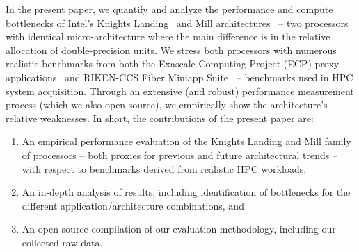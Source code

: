 In the present paper, we quantify and analyze the performance and compute bottlenecks of
Intel's Knights Landing~\cite{sodani_knights_2016} and Mill architectures~\cite{bradford_knights_2017} -- two
processors with identical micro-architecture where the main difference is in the relative allocation of double-precision units.
We stress both processors with numerous realistic benchmarks from both the
Exascale Computing Project (ECP) proxy applications~\cite{noauthor_ecp_2018} and
RIKEN-CCS Fiber Miniapp Suite~\cite{riken_aics_fiber_2015} -- benchmarks used in HPC system acquisition.
Through an extensive (and robust) performance measurement process (which we also open-source), we
empirically show the architecture's relative weaknesses. In short, the contributions of the present paper are:
\begin{enumerate}
    \item An empirical performance evaluation of the Knights Landing and Mill family of processors -- both proxies for previous and future architectural trends -- with respect to benchmarks derived from realistic HPC workloads,
    \item  An in-depth analysis of results, including identification of bottlenecks for the different application/architecture combinations, and
    \item An open-source compilation of our evaluation methodology, including our collected raw data.
\end{enumerate}
%
%

